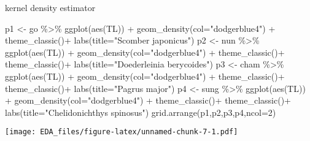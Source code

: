 \documentclass[
]{article}
\newenvironment{Shaded}{\begin{snugshade}}{\end{snugshade}}
\newcommand{\AttributeTok}[1]{\textcolor[rgb]{0.77,0.63,0.00}{#1}}
\newcommand{\DecValTok}[1]{\textcolor[rgb]{0.00,0.00,0.81}{#1}}
\newcommand{\FunctionTok}[1]{\textcolor[rgb]{0.00,0.00,0.00}{#1}}
\newcommand{\NormalTok}[1]{#1}
\newcommand{\OtherTok}[1]{\textcolor[rgb]{0.56,0.35,0.01}{#1}}
\newcommand{\SpecialCharTok}[1]{\textcolor[rgb]{0.00,0.00,0.00}{#1}}
\newcommand{\StringTok}[1]{\textcolor[rgb]{0.31,0.60,0.02}{#1}}
\begin{document}
kernel density estimator

\begin{Shaded}
\begin{Highlighting}[]
\NormalTok{p1 }\OtherTok{\textless{}{-}}\NormalTok{ go }\SpecialCharTok{\%\textgreater{}\%} \FunctionTok{ggplot}\NormalTok{(}\FunctionTok{aes}\NormalTok{(TL)) }\SpecialCharTok{+} \FunctionTok{geom\_density}\NormalTok{(}\AttributeTok{col=}\StringTok{"dodgerblue4"}\NormalTok{) }\SpecialCharTok{+} \FunctionTok{theme\_classic}\NormalTok{()}\SpecialCharTok{+} \FunctionTok{labs}\NormalTok{(}\AttributeTok{title=}\StringTok{"Scomber japonicus"}\NormalTok{)}
\NormalTok{p2 }\OtherTok{\textless{}{-}}\NormalTok{ nun }\SpecialCharTok{\%\textgreater{}\%} \FunctionTok{ggplot}\NormalTok{(}\FunctionTok{aes}\NormalTok{(TL)) }\SpecialCharTok{+} \FunctionTok{geom\_density}\NormalTok{(}\AttributeTok{col=}\StringTok{"dodgerblue4"}\NormalTok{) }\SpecialCharTok{+} \FunctionTok{theme\_classic}\NormalTok{()}\SpecialCharTok{+} \FunctionTok{theme\_classic}\NormalTok{()}\SpecialCharTok{+} \FunctionTok{labs}\NormalTok{(}\AttributeTok{title=}\StringTok{"Doederleinia berycoides"}\NormalTok{)}
\NormalTok{p3 }\OtherTok{\textless{}{-}}\NormalTok{ cham }\SpecialCharTok{\%\textgreater{}\%} \FunctionTok{ggplot}\NormalTok{(}\FunctionTok{aes}\NormalTok{(TL)) }\SpecialCharTok{+} \FunctionTok{geom\_density}\NormalTok{(}\AttributeTok{col=}\StringTok{"dodgerblue4"}\NormalTok{) }\SpecialCharTok{+} \FunctionTok{theme\_classic}\NormalTok{()}\SpecialCharTok{+} \FunctionTok{theme\_classic}\NormalTok{()}\SpecialCharTok{+} \FunctionTok{labs}\NormalTok{(}\AttributeTok{title=}\StringTok{"Pagrus major"}\NormalTok{)}
\NormalTok{p4 }\OtherTok{\textless{}{-}}\NormalTok{ sung }\SpecialCharTok{\%\textgreater{}\%} \FunctionTok{ggplot}\NormalTok{(}\FunctionTok{aes}\NormalTok{(TL)) }\SpecialCharTok{+} \FunctionTok{geom\_density}\NormalTok{(}\AttributeTok{col=}\StringTok{"dodgerblue4"}\NormalTok{) }\SpecialCharTok{+} \FunctionTok{theme\_classic}\NormalTok{()}\SpecialCharTok{+} \FunctionTok{theme\_classic}\NormalTok{()}\SpecialCharTok{+} \FunctionTok{labs}\NormalTok{(}\AttributeTok{title=}\StringTok{"Chelidonichthys spinosus"}\NormalTok{)}
\FunctionTok{grid.arrange}\NormalTok{(p1,p2,p3,p4,}\AttributeTok{ncol=}\DecValTok{2}\NormalTok{)}
\end{Highlighting}
\end{Shaded}

\texttt{[image: EDA\_files/figure-latex/unnamed-chunk-7-1.pdf]}
\end{document}
